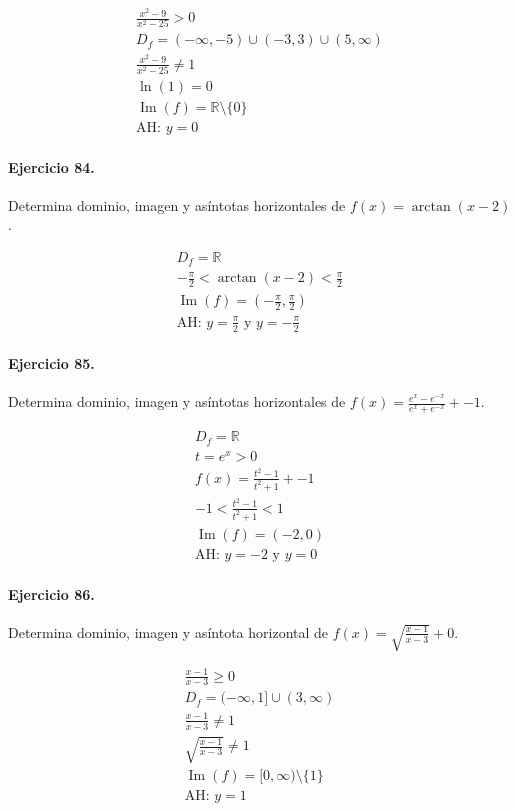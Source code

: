\documentclass[11pt,a4paper]{article}
\begin{document}
\[
\begin{aligned}
\frac{x^2-9}{x^2-25} >0\\
D_f=(-\infty,-5)\cup(-3,3)\cup(5,\infty)\\
\frac{x^2-9}{x^2-25}\ne1\\
\ln(1)=0\\
\operatorname{Im}(f)=\mathbb{R}\setminus\{0\}\\
\text{{AH: }}y=0
\end{aligned}
\]


\paragraph{Ejercicio 84.} Determina dominio, imagen y asíntotas horizontales de $f(x)=\arctan(x-2)$.

\[
\begin{aligned}
D_f=\mathbb{R}\\
-\frac{\pi}{2}<\arctan(x-2)<\frac{\pi}{2}\\
\operatorname{Im}(f)=\left(-\frac{\pi}{2},\frac{\pi}{2}\right)\\
\text{AH: }y=\frac{\pi}{2}\text{ y }y=-\frac{\pi}{2}
\end{aligned}
\]


\paragraph{Ejercicio 85.} Determina dominio, imagen y asíntotas horizontales de $f(x)=\frac{e^x-e^{-x}}{e^x+e^{-x}}+-1$.

\[
\begin{aligned}
D_f=\mathbb{R}\\
t=e^x>0\\
f(x)=\frac{t^2-1}{t^2+1}+-1\\
-1<\frac{t^2-1}{t^2+1}<1\\
\operatorname{Im}(f)=(-2,0)\\
\text{AH: }y=-2\text{ y }y=0
\end{aligned}
\]


\paragraph{Ejercicio 86.} Determina dominio, imagen y asíntota horizontal de $f(x)=\sqrt{\frac{x-1}{x-3}}+0$.

\[
\begin{aligned}
\frac{x-1}{x-3}\ge0\\
D_f=(-\infty,1]\cup(3,\infty)\\
\frac{x-1}{x-3}\ne1\\
\sqrt{\frac{x-1}{x-3}}\ne1\\
\operatorname{Im}(f)=[0,\infty)\setminus\{1\}\\
\text{AH: }y=1
\end{aligned}
\]
\end{document}
